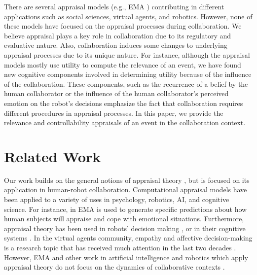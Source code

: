 \documentclass{article}
\begin{document}
There are several appraisal models (e.g., EMA \cite{marsella:ema-process-model})
contributing in different applications such as social sciences, virtual agents,
and robotics. However, none of these models have focused on the appraisal
processes during collaboration. We believe appraisal plays a key role in
collaboration due to its regulatory and evaluative nature. Also, collaboration
induces some changes to underlying appraisal processes due to its unique nature.
For instance, although the appraisal models mostly use utility to compute the
relevance of an event, we have found new cognitive components involved in
determining utility because of the influence of the collaboration. These
components, such as the recurrence of a belief by the human collaborator or the
influence of the human collaborator's perceived emotion on the robot's decisions
emphasize the fact that collaboration requires different procedures in appraisal
processes. In this paper, we provide the relevance and controllability
appraisals of an event in the collaboration context.


\vspace*{-2mm}
\section{Related Work}
\vspace*{-1mm}
Our work builds on the general notions of appraisal theory
\cite{gratch:domain-independent,marsella:computational,scherer:sequential-appraisal-process,scherer:appraisal-processes},
but is focused on its application in human-robot collaboration. Computational
appraisal models have been applied to a variety of uses in psychology, robotics,
AI, and cognitive science. For instance, in \cite{marsella:ema-process-model}
EMA is used to generate specific predictions about how human subjects will
appraise and cope with emotional situations. Furthermore, appraisal theory has
been used in robots' decision making \cite{castro:autonomous-robot-fear}, or in
their cognitive systems
\cite{hudlicka:emotinos-reasons,marinier:emotion-reinforcement}. In the virtual
agents community, empathy and affective decision-making is a research topic that
has received much attention in the last two decades
\cite{scott:modeling-empathy-agent,paiva:agent-care,pontier:women-robot-men,velasquez:emotions-motivations-agents}.
However, EMA and other work in artificial intelligence and robotics which apply
appraisal theory do not focus on the dynamics of collaborative contexts
\cite{adam:bdi-emotional-companion,kim:model-hri-appraisal,marsella:ema-process-model,rosenbloom:sigma-appraisal}.
\end{document}
